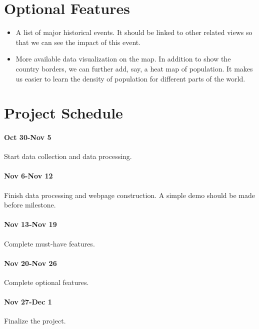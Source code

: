 \documentclass[12pt, fullpage,letterpaper]{article}
\begin{document}
\section{Optional Features}
\begin{itemize}
    \item A list of major historical events. It should be linked to other related views so that we can see the impact of this event.
    \item More available data visualization on the map. In addition to show the country borders, we can further add, say, a heat map of population. It makes us easier to learn the density of population for different parts of the world.
\end{itemize}
\section{Project Schedule}
\paragraph{Oct 30-Nov 5} Start data collection and data processing.
\paragraph{Nov 6-Nov 12} Finish data processing and webpage construction. A simple demo should be made before milestone.
\paragraph{Nov 13-Nov 19} Complete must-have features.
\paragraph{Nov 20-Nov 26} Complete optional features.
\paragraph{Nov 27-Dec 1} Finalize the project.
\end{document}
